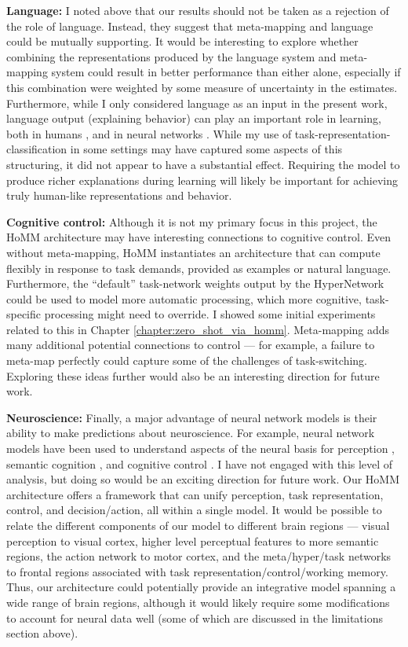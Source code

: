 \textbf{Language:} I noted above that our results should not be taken as a rejection of the role of language. Instead, they suggest that meta-mapping and language could be mutually supporting. It would be interesting to explore whether combining the representations produced by the language system and meta-mapping system could result in better performance than either alone, especially if this combination were weighted by some measure of uncertainty in the estimates. Furthermore, while I only considered language as an input in the present work, language output (explaining behavior) can play an important role in learning, both in humans \citep{Chi1994}, and in neural networks \citep{Mu2019}. While my use of task-representation-classification in some settings may have captured some aspects of this structuring, it did not appear to have a substantial effect. Requiring the model to produce richer explanations during learning will likely be important for achieving truly human-like representations and behavior. 

\textbf{Cognitive control:} Although it is not my primary focus in this project, the HoMM architecture may have interesting connections to cognitive control. Even without meta-mapping, HoMM instantiates an architecture that can compute flexibly in response to task demands, provided as examples or natural language. Furthermore, the ``default'' task-network weights output by the HyperNetwork could be used to model more automatic processing, which more cognitive, task-specific processing might need to override. I showed some initial experiments related to this in Chapter \ref{chapter:zero_shot_via_homm}. Meta-mapping adds many additional potential connections to control --- for example, a failure to meta-map perfectly could capture some of the challenges of task-switching. Exploring these ideas further would also be an interesting direction for future work. \par

\textbf{Neuroscience:} Finally, a major advantage of neural network models is their ability to make predictions about neuroscience. For example, neural network models have been used to understand aspects of the neural basis for perception \citep{Yamins2016a}, semantic cognition \citep{Rogers2004}, and cognitive control \citep{Shenhav2013}. I have not engaged with this level of analysis, but doing so would be an exciting direction for future work. Our HoMM architecture offers a framework that can unify perception, task representation, control, and decision/action, all within a single model. It would be possible to relate the different components of our model to different brain regions --- visual perception to visual cortex, higher level perceptual features to more semantic regions, the action network to motor cortex, and the meta/hyper/task networks to frontal regions associated with task representation/control/working memory. Thus, our architecture could potentially provide an integrative model spanning a wide range of brain regions, although it would likely require some modifications to account for neural data well (some of which are discussed in the limitations section above). \par 

